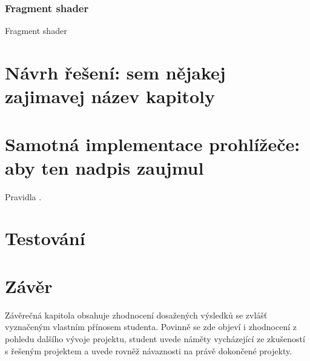 \subsection{Fragment shader}
Fragment shader



\chapter{Návrh řešení: sem nějakej zajimavej název kapitoly}
\label{chapter:3}




\chapter{Samotná implementace prohlížeče: aby ten nadpis zaujmul}
\label{chapter:4}

Pravidla \cite{Pravidla}. 

\chapter{Testování}
\label{chapter:5}


\chapter{Závěr}
\label{chapter:6}

Závěrečná kapitola obsahuje zhodnocení dosažených výsledků se zvlášť vyznačeným vlastním přínosem studenta. Povinně se zde objeví i zhodnocení z pohledu dalšího vývoje projektu, student uvede náměty vycházející ze zkušeností s řešeným projektem a uvede rovněž návaznosti na právě dokončené projekty.

